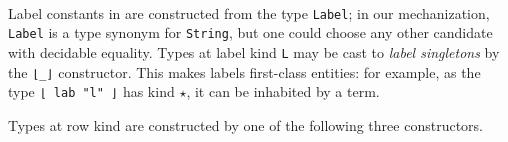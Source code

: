 \documentclass[authoryear, acmsmall, screen, review, nonacm]{acmart}
\begin{document}
\begin{code}%
%
\>[2]\AgdaSpace{}%
\AgdaSymbol{:}\<%
\\
\>[2][@{}l@{\AgdaIndent{0}}]%
\>[4]\AgdaSymbol{(}\AgdaSpace{}%
\AgdaSymbol{:}\AgdaSpace{}%
\AgdaSymbol{)}\AgdaSpace{}%
\<%
\\
%
\>[4]\AgdaSpace{}%
\AgdaSpace{}%
\<%
\\
%
\\[\AgdaEmptyExtraSkip]%
%
\>[2]\AgdaSpace{}%
\AgdaSymbol{:}\<%
\\
\>[2][@{}l@{\AgdaIndent{0}}]%
\>[4]\AgdaSymbol{(}\AgdaSpace{}%
\AgdaSymbol{:}\AgdaSpace{}%
\AgdaSpace{}%
\AgdaSpace{}%
\AgdaSymbol{)}\AgdaSpace{}%
\<%
\\
%
\>[4]\AgdaSpace{}%
\AgdaSpace{}%
\<%
\end{code}

Label constants in \Rome are constructed from the type \verb!Label!; in our mechanization, \verb!Label! is a type synonym for \verb!String!, but one could choose any other candidate with decidable equality. Types at label kind \verb!L! may be cast to \emph{label singletons} by the \verb!⌊_⌋! constructor. This makes labels first-class entities: for example, as the type \verb!⌊ lab "l" ⌋! has kind $\star$, it can be inhabited by a term.

Types at row kind are constructed by one of the following three constructors.
\end{document}
